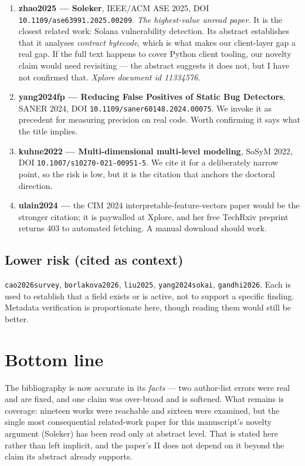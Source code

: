 \documentclass[10pt,a4paper]{article}
\begin{document}
\begin{enumerate}[leftmargin=1.4em,itemsep=2pt]
\item \textbf{zhao2025 --- Soleker}, IEEE/ACM ASE 2025, DOI \texttt{10.1109/ase63991.2025.00209}.
  \emph{The highest-value unread paper.} It is the closest related work: Solana vulnerability
  detection. Its abstract establishes that it analyses \emph{contract bytecode}, which is what
  makes our client-layer gap a real gap. If the full text happens to cover Python client tooling,
  our novelty claim would need revisiting --- the abstract suggests it does not, but I have not
  confirmed that. \emph{Xplore document id 11334576.}
\item \textbf{yang2024fp --- Reducing False Positives of Static Bug Detectors}, SANER 2024,
  DOI \texttt{10.1109/saner60148.2024.00075}. We invoke it as precedent for measuring precision on
  real code. Worth confirming it says what the title implies.
\item \textbf{kuhne2022 --- Multi-dimensional multi-level modeling}, SoSyM 2022,
  DOI \texttt{10.1007/s10270-021-00951-5}. We cite it for a deliberately narrow point, so the risk
  is low, but it is the citation that anchors the doctoral direction.
\item \textbf{ulain2024 --- } the CIM 2024 interpretable-feature-vectors paper would be the
  stronger citation; it is paywalled at Xplore, and her free TechRxiv preprint returns 403 to
  automated fetching. A manual download should work.
\end{enumerate}

\subsection*{Lower risk (cited as context)}

\texttt{cao2026survey}, \texttt{borlakova2026}, \texttt{liu2025}, \texttt{yang2024sokai},
\texttt{gandhi2026}. Each is used to establish that a field exists or is active, not to support a
specific finding. Metadata verification is proportionate here, though reading them would still be
better.

\section*{Bottom line}

The bibliography is now accurate in its \emph{facts} --- two author-list errors were real and are
fixed, and one claim was over-broad and is softened. What remains is coverage: nineteen works were
reachable and sixteen were examined, but the single most consequential related-work paper for this
manuscript's novelty argument (Soleker) has been read only at abstract level. That is stated here
rather than left implicit, and the paper's \textsection II does not depend on it beyond the claim
its abstract already supports.
\end{document}
